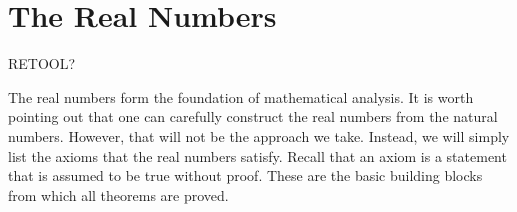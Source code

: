 \chapter{The Real Numbers}\label{chap:RealNumbers}

RETOOL?

The real numbers form the foundation of mathematical analysis. It is worth pointing out that one can carefully construct the real numbers from the natural numbers.  However, that will not be the approach we take.  Instead, we will simply list the axioms that the real numbers satisfy.  Recall that an axiom is a statement that is assumed to be true without proof. These are the basic building blocks from which all theorems are proved. 